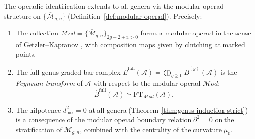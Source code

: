 \begin{theorem}\label{thm:prism-higher-genus}
The operadic identification extends to all genera via the
modular operad structure on $\{\overline{\mathcal{M}}_{g,n}\}$
(Definition~\ref{def:modular-operad}).
Precisely:
\begin{enumerate}[label=\textup{(\roman*)}]
\item The collection $\mathcal{M}od = \{\overline{\mathcal{M}}_{g,n}
 \}_{2g-2+n>0}$ forms a modular operad in the sense of
 Getzler--Kapranov \cite{GeK98}, with composition maps given by
 clutching at marked points.
\item The full genus-graded bar complex
 $\bar{B}^{\mathrm{full}}(\mathcal{A}) = \bigoplus_{g \geq 0}
 \bar{B}^{(g)}(\mathcal{A})$ is the \emph{Feynman transform}
 of $\mathcal{A}$ with respect to the modular operad
 $\mathcal{M}od$:
 \[
 \bar{B}^{\mathrm{full}}(\mathcal{A}) \simeq
 \mathrm{FT}_{\mathcal{M}od}(\mathcal{A}).
 \]
\item The nilpotence $d_{\mathrm{bar}}^2 = 0$ at all genera
 (Theorem~\ref{thm:genus-induction-strict}) is a consequence of the
 modular operad boundary relation $\partial^2 = 0$ on the
 stratification of $\overline{\mathcal{M}}_{g,n}$, combined with the
 centrality of the curvature $\mu_0$.
\end{enumerate}
\end{theorem}

